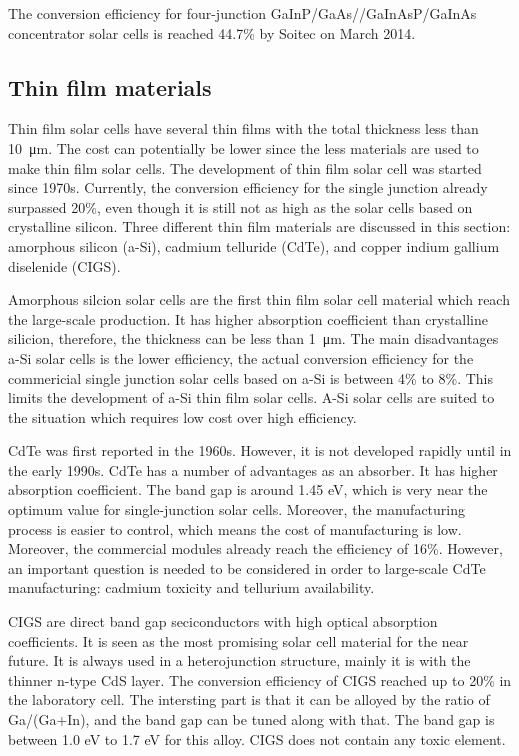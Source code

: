 \documentclass[a4paper, 12pt, titlepage,oneside,drop]{kthesis}
\begin{document}
The conversion efficiency for four-junction GaInP/GaAs//GaInAsP/GaInAs concentrator solar cells is reached 44.7\% by Soitec on March 2014.

\subsection{Thin film materials}

Thin film solar cells have several thin films with the total thickness less than \SI{10} {\micro\meter}. The cost can potentially be lower since the less materials are used to make thin film solar cells. The development of thin film
solar cell was started since 1970s. Currently, the conversion efficiency for the single junction already surpassed 20\%, even though it is still not as high as the solar cells based on crystalline silicon. Three different thin film
materials are discussed in this section: amorphous silicon (a-Si), cadmium telluride (CdTe), and copper indium gallium diselenide (CIGS).

Amorphous silcion solar cells are the first thin film solar cell material which reach the large-scale production. It has higher absorption coefficient than crystalline silicion, therefore, the thickness can be less than \SI{1} {\micro\meter}. The 
main disadvantages a-Si solar cells is the lower efficiency, the actual conversion efficiency for the commericial single junction solar cells based on a-Si is between 4\% to 8\%. This limits the development of a-Si thin film solar cells.
A-Si solar cells are suited to the situation which requires low cost over high efficiency. 

CdTe was first reported in the 1960s. However, it is not developed rapidly until in the early 1990s. CdTe has a number of advantages as an absorber. It has higher absorption coefficient. The band gap is around 1.45 eV, which 
is very near the optimum value for single-junction solar cells. Moreover, the manufacturing process is easier to control, which means the cost of manufacturing is low. Moreover, the commercial modules already reach the efficiency of 16\%.
However, an important question is needed to be considered in order to large-scale CdTe manufacturing: cadmium toxicity and tellurium availability. 

CIGS are direct band gap seciconductors with high optical absorption coefficients. It is seen as the most promising solar cell material for the near future. It is always used in a heterojunction structure, mainly it is with the thinner
n-type CdS layer. The conversion efficiency of CIGS reached up to 20\% in the laboratory cell. The intersting part is that it can be alloyed by the ratio of Ga/(Ga+In), and the band gap can be tuned along with that. The band gap 
is between 1.0 eV to 1.7 eV for this alloy. CIGS does not contain any toxic element.
\end{document}
